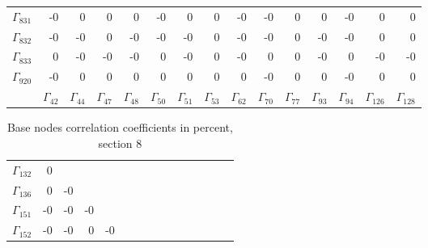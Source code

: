 {\begin{table}
\begin{center}
\begin{minipage}{\linewidth}
\begin{center}
\begin{envsmall}
\begin{center}
\begin{tabular}{rrrrrrrrrrrrrrr}
\hline
\( \Gamma_{831} \) &   -0 &    0 &    0 &    0 &   -0 &    0 &    0 &   -0 &   -0 &    0 &    0 &   -0 &    0 &    0 \\
\( \Gamma_{832} \) &   -0 &   -0 &    0 &   -0 &   -0 &   -0 &    0 &   -0 &   -0 &    0 &   -0 &   -0 &    0 &    0 \\
\( \Gamma_{833} \) &    0 &   -0 &   -0 &   -0 &    0 &   -0 &    0 &   -0 &    0 &    0 &   -0 &    0 &   -0 &   -0 \\
\( \Gamma_{920} \) &   -0 &    0 &    0 &    0 &    0 &    0 &    0 &    0 &   -0 &    0 &    0 &   -0 &    0 &    0 \\
 & \( \Gamma_{42} \) & \( \Gamma_{44} \) & \( \Gamma_{47} \) & \( \Gamma_{48} \) & \( \Gamma_{50} \) & \( \Gamma_{51} \) & \( \Gamma_{53} \) & \( \Gamma_{62} \) & \( \Gamma_{70} \) & \( \Gamma_{77} \) & \( \Gamma_{93} \) & \( \Gamma_{94} \) & \( \Gamma_{126} \) & \( \Gamma_{128} \)
\\\hline
\end{tabular}
\end{center}
\end{envsmall}
\ifhevea\else
\end{center}
\end{minipage}
\fi
\end{center}
\ifhevea\end{table}\fi
\ifhevea\begin{table}\fi%
\begin{center}
\ifhevea
\caption{Base nodes correlation coefficients in percent, section 8\label{tab:tau:br-fit-corr8}}%
\else
\begin{minipage}{\linewidth}
\begin{center}
\label{tab:tau:br-fit-corr8}%
\fi
\begin{envsmall}
\begin{center}
\renewcommand*{\arraystretch}{1.1}%
\begin{tabular}{rrrrrrrrrrrrrrr}
\hline
\( \Gamma_{132} \) &    0 &  &  &  &  &  &  &  &  &  &  &  &  &  \\
\( \Gamma_{136} \) &    0 &   -0 &  &  &  &  &  &  &  &  &  &  &  &  \\
\( \Gamma_{151} \) &   -0 &   -0 &   -0 &  &  &  &  &  &  &  &  &  &  &  \\
\( \Gamma_{152} \) &   -0 &   -0 &    0 &   -0 &  &  &  &  &  &  &  &  &  &  \\

\end{tabular}
\end{center}
\end{envsmall}
\end{center}
\end{minipage}
\end{center}
\end{table}}
